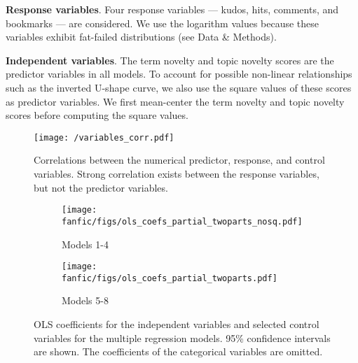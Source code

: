 \documentclass[letterpaper]{article} %
\begin{document}
\textbf{Response variables}.  Four response variables --- kudos, hits, comments, and bookmarks --- are considered. We use the logarithm values because these variables exhibit fat-failed distributions (see Data & Methods).


\textbf{Independent variables}. The term novelty and topic novelty scores are the predictor variables in all models. To account for possible non-linear relationships such as the inverted U-shape curve, we also use the square values of these scores as predictor variables. We first mean-center the term novelty and topic novelty scores before computing the square values.

\begin{figure}
    \centering
          \texttt{[image: /variables\_corr.pdf]}
        \caption{Correlations between the numerical predictor, response, and control variables. Strong correlation exists between the response variables, but not the predictor variables. }
        \label{fig:corr}
\end{figure}

\begin{figure*}[h]
    \centering
    \begin{subfigure}{\textwidth}
            \texttt{[image: fanfic/figs/ols\_coefs\_partial\_twoparts\_nosq.pdf]}
  		\caption{Models 1-4} 
			\label{fig:ols_partial_nosq}
       \end{subfigure}
      \begin{subfigure}{\textwidth}
          \texttt{[image: fanfic/figs/ols\_coefs\_partial\_twoparts.pdf]}
		\caption{Models 5-8} 
		\label{fig:ols_partial}
       \end{subfigure}
           	\caption{OLS coefficients for the independent variables and selected control variables for the multiple regression models. 95\% confidence intervals are shown. The coefficients of the categorical variables are omitted.}
        \label{fig:ols}
\end{figure*}
\end{document}
